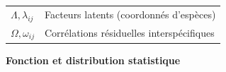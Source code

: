 \documentclass[12pt,]{article}
\begin{document}
{\begin{longtable}[l]{@{}ll@{}}
\begin{minipage}[t]{0.34\columnwidth}\raggedright
\(\Lambda, \lambda_{ij}\)\strut
\end{minipage} & \begin{minipage}[t]{0.60\columnwidth}\raggedright
Facteurs latents (coordonnés d'espèces)\strut
\end{minipage}\tabularnewline
\begin{minipage}[t]{0.34\columnwidth}\raggedright
\(\Omega, \omega_{ij}\)\strut
\end{minipage} & \begin{minipage}[t]{0.60\columnwidth}\raggedright
Corrélations résiduelles interspécifiques\strut
\end{minipage}\tabularnewline
\bottomrule
\end{longtable}}\FloatBarrier


\textbf{Fonction et distribution statistique}
\end{document}
